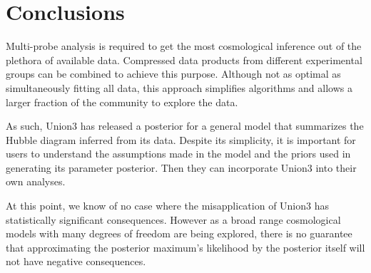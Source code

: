 \documentclass[11pt,a4paper]{article}
\begin{document}
\section{Conclusions}
Multi-probe  analysis is required to get the most cosmological inference out of the plethora of available data. 
Compressed data products from different experimental groups can be combined to achieve this purpose.
Although not as optimal as simultaneously fitting all data, this approach simplifies algorithms and allows a larger
fraction of
the community to explore the data.

As such, Union3 has released a posterior for a general model that summarizes the Hubble diagram inferred from its data.
Despite its simplicity, it is important for users to understand the assumptions made in the model and the priors used
in generating its parameter posterior.  Then they can incorporate Union3 into their own analyses.

At this point, we know of no case where the misapplication of Union3 has statistically significant consequences.
However as a broad range cosmological models with many degrees of freedom are being
explored, there is no guarantee that approximating the posterior maximum's likelihood by the posterior itself
will not have negative consequences.



\end{document}
